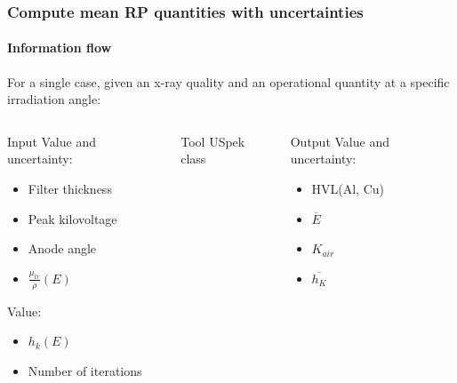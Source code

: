 \documentclass{beamer}
\newcommand{\highlight}[1]{{\color{blue} #1}}
\begin{document}
	\begin{frame}
		\frametitle{Compute mean RP quantities with uncertainties}
		\framesubtitle{Information flow}
		For a \highlight{single case}, given an x-ray quality and an operational quantity at a specific irradiation angle:
		\begin{columns}[t]
			\begin{column}{0.35\textwidth}
				\begin{block}{Input}
					Value and uncertainty:
					\begin{itemize}
						\item Filter thickness
						\item Peak kilovoltage
						\item Anode angle
						\item $\frac{\mu_{tr}}{\rho}(E)$
					\end{itemize}
					Value:
					\begin{itemize}
						\item $h_k(E)$
						\item Number of iterations
					\end{itemize}
				\end{block}
			\end{column}
			\begin{column}{0.23\textwidth}
				\begin{block}{Tool}
					USpek class
				\end{block}
			\end{column}
			\begin{column}{0.32\textwidth}
				\begin{block}{Output}
					Value and uncertainty:
					\begin{itemize}
						\item HVL(Al, Cu)
						\item $\overline{E}$
						\item $K_{air}$
						\item $\overline{h_K}$
					\end{itemize}
				\end{block}
			\end{column}
		\end{columns}
	\end{frame}
	
\end{document}
